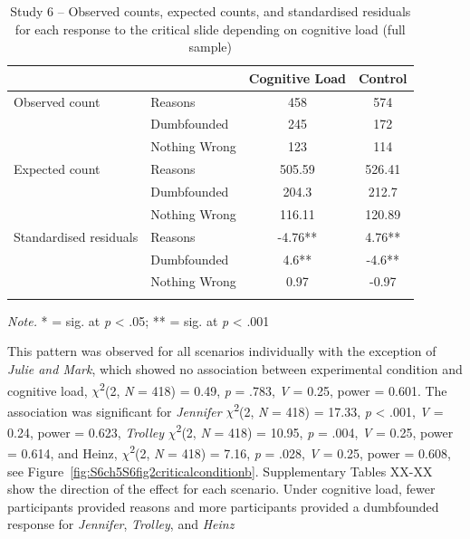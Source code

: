 \documentclass[
  american,
  man,floatsintext]{apa7}
\begin{document}
\begin{table}[tbp]

\begin{center}
\begin{threeparttable}

\caption{\label{tab:S6tab1dumb}Study 6 – Observed counts, expected counts, and standardised residuals for each response to the critical slide depending on cognitive load (full sample)}

\begin{tabular}{llcc}
\toprule
 & \multicolumn{1}{c}{} & \multicolumn{1}{c}{Cognitive Load} & \multicolumn{1}{c}{Control}\\
\midrule
Observed count & Reasons & 458 & 574\\
 & Dumbfounded & 245 & 172\\
 & Nothing Wrong & 123 & 114\\
Expected count & Reasons & 505.59 & 526.41\\
 & Dumbfounded & 204.3 & 212.7\\
 & Nothing Wrong & 116.11 & 120.89\\
Standardised residuals & Reasons & -4.76** & 4.76**\\
 & Dumbfounded & 4.6** & -4.6**\\
 & Nothing Wrong & 0.97 & -0.97\\
\bottomrule
\addlinespace
\end{tabular}

\begin{tablenotes}[para]
\normalsize{\textit{Note.} * = sig. at \emph{p} < .05; ** = sig. at \emph{p} < .001}
\end{tablenotes}

\end{threeparttable}
\end{center}

\end{table}

\newpage

This pattern was observed for all scenarios individually with the exception of \emph{Julie and Mark}, which showed no association between experimental condition and cognitive load, \(\chi\)\textsuperscript{2}(2, \emph{N} = 418) = 0.49, \emph{p} = .783, \emph{V} = 0.25, power = 0.601. The association was significant for \emph{Jennifer} \(\chi\)\textsuperscript{2}(2, \emph{N} = 418) = 17.33, \emph{p} \textless{} .001, \emph{V} = 0.24, power = 0.623, \emph{Trolley} \(\chi\)\textsuperscript{2}(2, \emph{N} = 418) = 10.95, \emph{p} = .004, \emph{V} = 0.25, power = 0.614, and Heinz, \(\chi\)\textsuperscript{2}(2, \emph{N} = 418) = 7.16, \emph{p} = .028, \emph{V} = 0.25, power = 0.608, see Figure~\ref{fig:S6ch5S6fig2criticalconditionb}. Supplementary Tables XX-XX show the direction of the effect for each scenario. Under cognitive load, fewer participants provided reasons and more participants provided a dumbfounded response for \emph{Jennifer}, \emph{Trolley}, and \emph{Heinz}
\end{document}
